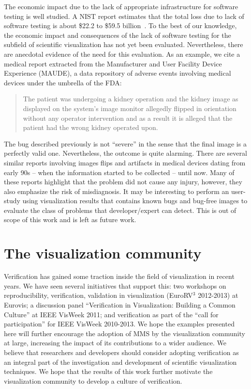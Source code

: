 The economic impact due to the lack of appropriate infrastructure for software testing is well studied.
%
A NIST report estimates that the total loss due to lack of software testing is about \$22.2 to \$59.5 billion~\cite{tassey2002economic}. 
%
To the best of our knowledge, the economic impact and consequences of the lack of software testing for the subfield of scientific visualization has not yet been evaluated. 
%
Nevertheless, there are anecdotal evidence of the need for this evaluation. As an example, we cite a medical report extracted from the Manufacturer and User Facility Device Experience (MAUDE), a data repository of adverse events involving medical devices under the umbrella of the FDA:
\begin{quote}
The patient was undergoing a kidney operation and the kidney image as displayed on the system's image monitor allegedly flipped in orientation without any operator intervention and as a result it is alleged that the patient had the wrong kidney operated upon.
\end{quote}
The bug described previously is not  ``severe'' in the sense that the final image is a perfectly valid one. Nevertheless, the outcome is quite alarming. There are several similar reports involving images flips and artifacts in medical devices dating from early 90s -- when the information started to be collected -- until now. Many of these reports highlight that the problem did not cause any injury, however, they also emphasize the risk of misdiagnosis.
%
It may be interesting to perform an user-study using visualization results that contains known bugs and bug-free images to evaluate the class of problems that developer/expert can detect.  This is out of scope of this work and is left as future work.


\section{The visualization community}

Verification has gained some traction inside the field of visualization in recent years.  
%
We have seen several initiatives that support this: two workshops on reproducibility, verification, validation in visualization (EuroRV$^3$ 2012-2013) at Eurovis; a discussion panel ``Verification in Visualization: Building a Common Culture'' at IEEE VisWeek 2011; and verification as part of the ``call for participation'' for IEEE VisWeek 2010-2013.
%
We hope the  examples presented here will further encourage the adoption of MMS by the visualization community at large, increasing the impact of its contributions  to a wider audience.
%
We believe that researchers and developers should consider adopting verification as an integral part of the investigation and development of scientific visualization techniques.
%
We hope that the results of this work further motivate the visualization
community to develop a culture of verification.


